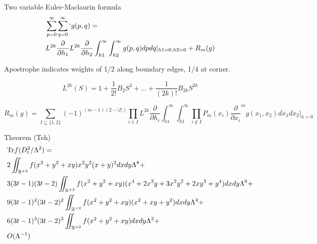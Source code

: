 \documentclass{beamer}
\def\R{{\mathbb R}}
\def\Tr{{\rm Tr}}
\begin{document}
\begin{frame}
  \begin{block}{Two variable Euler-Maclaurin formula}
    \begin{align*}
      &\sum_{p=0}^{\infty} \sum_{q=0}^{\infty} ` g(p,q) =\\
      &L^{2k} \frac{\partial}{\partial h_1}L^{2k} \frac{\partial}{\partial h_2} \int_{h1}^{\infty} \int_{h2}^{\infty} g(p,q)dpdq|_{h1=0, h2 = 0} + R_m(g) \\
    \end{align*}

    {\tiny
    Apostrophe indicates weights of 1/2 along boundary edges, 1/4 at corner.

    \[
      L^{2k}(S) = 1 + \frac{1}{2!}B_2S^2+ \ldots + \frac{1}{(2k)!} B_{2k}S^{2k}
    \]
    
    \[
      R_m(g) = \sum_{I \subsetneq \{1,2\}}(-1)^{(m-1)(2-|I|)}\prod_{i\in I} L^{2k} \frac{\partial}{\partial h_i} \int_{h1}^{\infty}\int_{h1}^{\infty} \prod_{i \notin I} P_m(x_i) \frac{\partial}{\partial x_i} ^m g(x_1,x_2)dx_1 dx_2 |_{h=0}
    \]
    }
  \end{block}
\end{frame}

\begin{frame}
	\begin{block}{Theorem (Teh)}
		{\tiny
		\begin{align*}
	 		&\Tr f(D_t^2/ \Lambda^2) = \\
			& 2 \iint_{\R ^{+2}} f (x^2 + y^2 + xy)x^2y^2(x+y)^2 dxdy \Lambda^8 +\\
			&3(3t-1)(3t-2)\iint_{\R ^{+2}}f(x^2+y^2+xy)(x^4+2x^3y+3x^2y^2+2xy^3 +y^4)dxdy\Lambda^6 +\\
			&9(3t-1)^2(3t-2)^2\iint_{\R ^{+2}}f(x^2 + y^2+xy)(x^2+xy+y^2)dxdy\Lambda^4 +\\
			&6(3t-1)^3(3t-2)^3 \iint_{\R ^{+2}} f(x^2 + y^2 +xy)dxdy \Lambda^2+ \\
			&O(\Lambda^{-1})
		\end{align*}
		}
	\end{block}
\end{frame}
\end{document}
